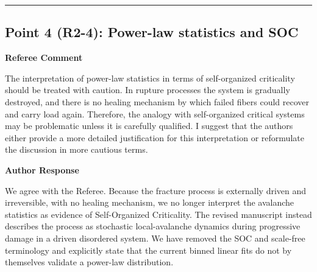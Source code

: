 \documentclass[11pt]{article}
\newenvironment{refereecomment}
  {%
    \par
    \begingroup
    \color{commentgray}
    \itshape
    \setlength{\leftskip}{1.4em}
    \setlength{\rightskip}{1.4em}
  }
  {%
    \par
    \endgroup
  }
\newcommand{\refereelabel}{%
  \par\smallskip
  {\color{commentgray}\bfseries Referee Comment}\par
}
\newcommand{\responselabel}{%
  \par\medskip
  {\color{responseblue}\bfseries Author Response}\par
}
\newcommand{\pointseparator}{%
  \par\bigskip
  {\color{rulegray}\hrule}
  \par\bigskip
}
\begin{document}
\pointseparator

\subsection*{Point 4 (R2-4): Power-law statistics and SOC}

\refereelabel
\begin{refereecomment}
The interpretation of power-law statistics in terms of self-organized
criticality should be treated with caution. In rupture processes the system is
gradually destroyed, and there is no healing mechanism by which failed fibers
could recover and carry load again. Therefore, the analogy with self-organized
critical systems may be problematic unless it is carefully qualified. I
suggest that the authors either provide a more detailed justification for this
interpretation or reformulate the discussion in more cautious terms.
\end{refereecomment}

\responselabel
We agree with the Referee. Because the fracture process is externally driven
and irreversible, with no healing mechanism, we no longer interpret the
avalanche statistics as evidence of Self-Organized Criticality. The revised
manuscript instead describes the process as stochastic local-avalanche
dynamics during progressive damage in a driven disordered system. We have
removed the SOC and scale-free terminology and explicitly state that the
current binned linear fits do not by themselves validate a power-law
distribution.
\end{document}
